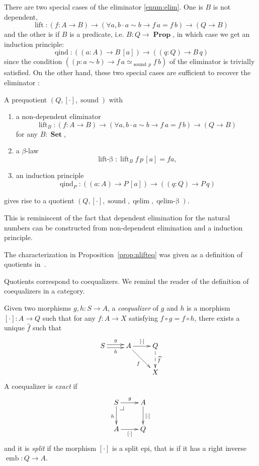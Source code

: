\documentclass[envcountsame]{llncs}
\makeatletter
\providecommand{\class}[1]{[#1]}
\providecommand{\dlift}[1]{\widehat{#1}}
\DeclareMathOperator{\Prop}{\mathbf{Prop}}
\DeclareMathOperator{\Set}{\mathbf{Set}}
\DeclareMathOperator{\sound}{sound}
\DeclareMathOperator{\qelimbeta}{qelim-\beta}
\DeclareMathOperator{\qind}{qind}
\DeclareMathOperator{\emb}{emb}
\DeclareMathOperator{\qelim}{qelim}
\DeclareMathOperator{\lift}{lift}
\DeclareMathOperator{\liftbeta}{lift-\beta}
\renewcommand{\equiv}{=}
\newcommand{\pullbackcorner}[1][dr]{\save*!/#1-1.2pc/#1:(-1,1)@^{|-}\restore}
\makeatother
\begin{document}
There are two special cases of the eliminator \ref{enum:elim}. One is $B$ is not dependent,
 \[\lift\colon (f\colon A \to B) \to (\forall a,b\cdot a\sim b \to f\,a \equiv f\,b) \to (Q \to B)\]
and the other is if $B$ is a predicate, i.e. $B : Q\to \Prop$, in which case we get an induction principle:
\[\qind \colon((a\colon A)\to B \,\class a)\to ((q\colon Q)\to B\,q)\]
since the condition $((p:a\sim b) \to f\,a \simeq_{\sound\,p}f\,b) $  of  the eliminator is trivially satisfied.
On the other hand, these two special cases are sufficient to recover the eliminator :


\begin{proposition}\label{prop:nlifteq}
A prequotient $(Q,\class\cdot,\sound)$ with

\begin{enumerate}
\item a non-dependent eliminator $$\lift_B\colon (f\colon A \to B) \to (\forall a,b\cdot a\sim b \to f\,a \equiv f\,b) \to (Q \to B)$$ for any $B\colon\Set$,
\item a $\beta$-law $$\liftbeta : \lift_B f \,p\,\class a\equiv f a,$$
\item an induction principle $$\qind_P\colon ((a\colon A)\to P \,\class a)\to ((q\colon Q)\to P\,q)$$
\end{enumerate}
gives rise to a quotient $(Q,\class\cdot,\sound,\qelim,\qelimbeta)$.
\end{proposition}
This is reminiscent of the fact that dependent elimination for the natural numbers can be constructed from non-dependent elimination and a induction principle.

The characterization in Proposition~\ref{prop:nlifteq} was given as a definition of quotients in~\cite{hofmann1995thesis}.


Quotients correspond to coequalizers. We remind the reader of the definition of coequalizers in a category.

\begin{definition}
Given two morphisms $g,h : S\to A$, a \emph{coequalizer} of $g$ and $h$ is a morphism $\class\cdot:A\to Q$ such that for any $f:A\to X$ satisfying $f \circ g = f \circ h$, there exists a unique $\dlift f$ such that
\[\xymatrix{
S\ar@<0.5ex>[r]^g\ar@<-0.5ex>[r]_h& A\ar[r]^{\class\cdot}\ar[dr]_{f} & Q\ar@{-->}[d]^{\dlift f}\\
&&X
}\]
A coequalizer is \emph{exact} if
\[\xymatrix{
S\pullbackcorner\ar[r]^g\ar[d]_h & A\ar[d]^{\class\cdot} \\
A\ar[r]_{\class\cdot} & Q
}\]
and it is \emph{split} if the morphism $\class\cdot$ is a split epi, that is if it has a right inverse $\emb : Q \to A$.
\end{definition}
\end{document}

